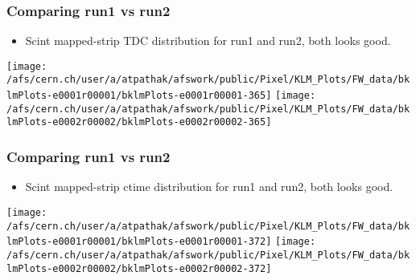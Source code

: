 \documentclass{beamer}
\begin{document}
\begin{frame}
\frametitle{Comparing run1 vs run2}
\vspace*{.05cm}

\begin{itemize} 
\item {\small Scint mapped-strip TDC distribution for run1 and run2, both looks good.}
\end{itemize}

\begin{center}
\begin{normalsize}

\vspace*{-.2cm}
\begin{center}

\texttt{[image: /afs/cern.ch/user/a/atpathak/afswork/public/Pixel/KLM\_Plots/FW\_data/bklmPlots-e0001r00001/bklmPlots-e0001r00001-365]}
\texttt{[image: /afs/cern.ch/user/a/atpathak/afswork/public/Pixel/KLM\_Plots/FW\_data/bklmPlots-e0002r00002/bklmPlots-e0002r00002-365]} \\

\end{center}
\end{normalsize}
\end{center}
\end{frame}
\begin{frame}
\frametitle{Comparing run1 vs run2}
\vspace*{.05cm}

\begin{itemize} 
\item {\small Scint mapped-strip ctime distribution for run1 and run2, both looks good.}
\end{itemize}

\begin{center}
\begin{normalsize}

\vspace*{-.2cm}
\begin{center}

\texttt{[image: /afs/cern.ch/user/a/atpathak/afswork/public/Pixel/KLM\_Plots/FW\_data/bklmPlots-e0001r00001/bklmPlots-e0001r00001-372]}
\texttt{[image: /afs/cern.ch/user/a/atpathak/afswork/public/Pixel/KLM\_Plots/FW\_data/bklmPlots-e0002r00002/bklmPlots-e0002r00002-372]} \\

\end{center}
\end{normalsize}
\end{center}
\end{frame}
\end{document}
